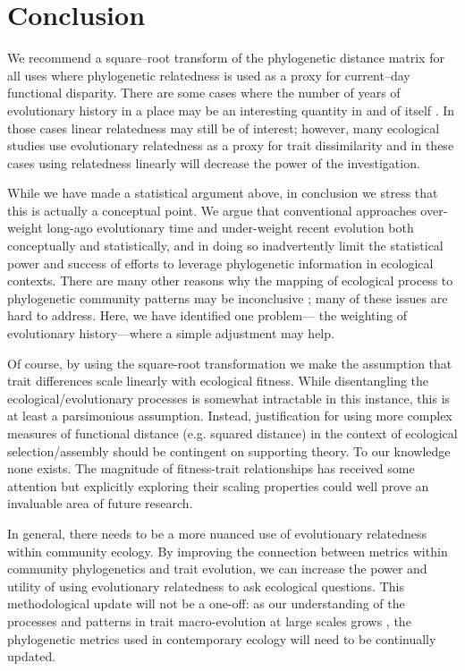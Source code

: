 \section{Conclusion}

We recommend a square--root transform of the phylogenetic distance matrix for 
all uses where phylogenetic relatedness is used as a proxy for current--day 
functional disparity. There are some cases where the number of years of 
evolutionary history in a place may be an interesting quantity in and of 
itself \citep{purvis2000}. In those cases linear relatedness may still be of 
interest; however, many ecological studies use evolutionary relatedness as a 
proxy for trait dissimilarity and in these cases using relatedness linearly 
will decrease the power of the investigation. 

While we have made a statistical argument above, in conclusion we stress that 
this is actually a conceptual point. We argue that conventional approaches over-weight long-ago 
evolutionary time and under-weight recent evolution both conceptually and statistically, and in 
doing so inadvertently limit the statistical power and success of efforts to leverage phylogenetic 
information in ecological contexts. There are many other reasons why the mapping of 
ecological process to phylogenetic community patterns may be inconclusive \citep{Mayfield2010, Godoy2014}; many of these issues are hard to address.  Here, we have identified one problem---
the weighting of evolutionary history---where a simple 
adjustment may help.

Of course, by using the square-root transformation we make the assumption that trait differences scale linearly with ecological fitness. While disentangling the ecological/evolutionary processes is somewhat intractable in this instance, this is at least a parsimonious assumption. Instead, justification for using more complex measures of functional distance (e.g. squared distance) in the context of ecological selection/assembly should be contingent on supporting theory. To our knowledge none exists. The magnitude of fitness-trait relationships has received some attention \citep{Kimball2011, Adler2013a} but explicitly exploring their scaling properties could well prove an invaluable area of future research.

In general, there needs to be a more nuanced use of evolutionary relatedness within community 
ecology.  By improving the connection between metrics within community phylogenetics and trait 
evolution, we can increase the power and utility of using evolutionary relatedness to ask ecological questions. 
This methodological update will not be a one-off: as our understanding of the processes and patterns in trait macro-evolution at large 
scales grows \citep{omeara2012, pennell2013integrative}, the phylogenetic metrics used in contemporary ecology will need to be 
continually updated.

